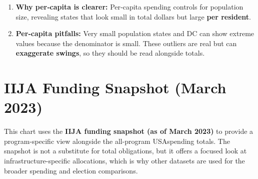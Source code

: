 \documentclass[
  11pt,
]{article}
\begin{document}
\begin{enumerate}
\def\labelenumi{\arabic{enumi}.}
\item
  \textbf{Why per‑capita is clearer:} Per‑capita spending controls for
  population size, revealing states that look small in total dollars but
  large \textbf{per resident}.
\item
  \textbf{Per‑capita pitfalls:} Very small population states and DC can
  show extreme values because the denominator is small. These outliers
  are real but can \textbf{exaggerate swings}, so they should be read
  alongside totals.
\end{enumerate}

\section{IIJA Funding Snapshot (March
2023)}\label{iija-funding-snapshot-march-2023}

This chart uses the \textbf{IIJA funding snapshot (as of March 2023)} to
provide a program-specific view alongside the all-program USAspending
totals. The snapshot is not a substitute for total obligations, but it
offers a focused look at infrastructure-specific allocations, which is
why other datasets are used for the broader spending and election
comparisons.
\end{document}
